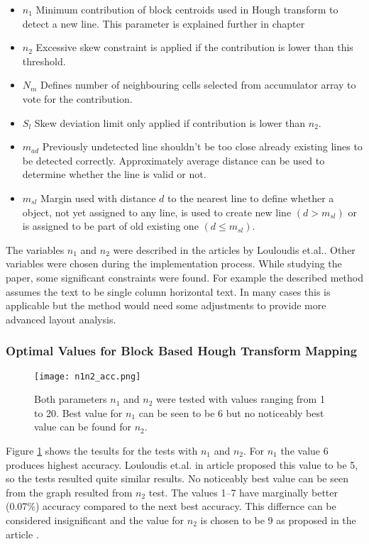 \documentclass{article}
\begin{document}
      \begin{itemize}
        \item $n_1$ Minimum contribution of block centroids used in Hough transform to detect a new line. This parameter is explained further in chapter
        \item $n_2$ Excessive skew constraint is applied if the contribution is lower than this threshold.
        \item $N_m$  Defines number of neighbouring cells selected from accumulator array to vote for the contribution.
        \item $S_l$ Skew deviation limit only applied if contribution is lower than $n_2$.
        \item $m_{ad}$ Previously undetected line shouldn't be too close already existing lines to be detected correctly. Approximately average distance can be used to determine whether the line is valid or not.
        \item $m_{sl}$ Margin used with distance $d$ to the nearest line to define whether a object, not yet assigned to any line, is used to create new line $(d > m_{sl})$ or is assigned to be part of old existing one $(d \leq m_{sl})$.
      \end{itemize}

    The variables $n_1$ and $n_2$ were described in the articles by Louloudis et.al.. Other variables were chosen during the implementation process. While studying the paper, some significant constraints were found. For example the described method assumes the text to be single column horizontal text. In many cases this is applicable but the method would need some adjustments to provide more advanced layout analysis.

    \subsubsection{Optimal Values for Block Based Hough Transform Mapping}
    \begin{figure}[!ht]
      \centering
      \texttt{[image: n1n2\_acc.png]}
      \caption{Both parameters $n_1$ and $n_2$ were tested with values ranging from 1 to 20. Best value for $n_1$ can be seen to be 6 but no noticeably best value can be found for $n_2$.
      \label{fig:n1n2}}
    \end{figure}

    Figure \ref{fig:n1n2} shows the tesults for the tests with $n_1$ and $n_2$. For $n_1$ the value 6 produces highest accuracy. Louloudis et.al. in article \cite{Louloudis2} proposed this value to be 5, so the tests resulted quite similar results. No noticeably best value can be seen from the graph resulted from $n_2$ test. The values 1--7 have marginally better (0.07\%) accuracy compared to the next best accuracy. This differnce can be considered insignificant and the value for $n_2$ is chosen to be 9 as proposed in the article \cite{Louloudis2}.
\end{document}
